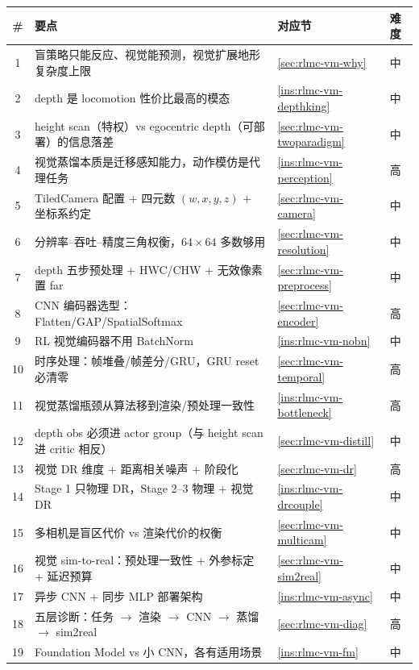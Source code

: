 \begin{center}
\small
\begin{tabular}{@{}clll@{}}
\toprule
\# & 要点 & 对应节 & 难度 \\
\midrule
1 & 盲策略只能反应、视觉能预测，视觉扩展地形复杂度上限 & \cref{sec:rlmc-vm-why} & 中 \\
2 & depth 是 locomotion 性价比最高的模态 & \cref{ins:rlmc-vm-depthking} & 中 \\
3 & height scan（特权）vs egocentric depth（可部署）的信息落差 & \cref{sec:rlmc-vm-twoparadigm} & 中 \\
4 & 视觉蒸馏本质是迁移感知能力，动作模仿是代理任务 & \cref{ins:rlmc-vm-perception} & 高 \\
5 & TiledCamera 配置 + 四元数 $(w,x,y,z)$ + 坐标系约定 & \cref{sec:rlmc-vm-camera} & 中 \\
6 & 分辨率--吞吐--精度三角权衡，$64\times64$ 多数够用 & \cref{sec:rlmc-vm-resolution} & 中 \\
7 & depth 五步预处理 + HWC/CHW + 无效像素置 far & \cref{sec:rlmc-vm-preprocess} & 中 \\
8 & CNN 编码器选型：Flatten/GAP/SpatialSoftmax & \cref{sec:rlmc-vm-encoder} & 高 \\
9 & RL 视觉编码器不用 BatchNorm & \cref{ins:rlmc-vm-nobn} & 中 \\
10 & 时序处理：帧堆叠/帧差分/GRU，GRU reset 必清零 & \cref{sec:rlmc-vm-temporal} & 高 \\
11 & 视觉蒸馏瓶颈从算法移到渲染/预处理一致性 & \cref{ins:rlmc-vm-bottleneck} & 高 \\
12 & depth obs 必须进 actor group（与 height scan 进 critic 相反） & \cref{sec:rlmc-vm-distill} & 中 \\
13 & 视觉 DR 维度 + 距离相关噪声 + 阶段化 & \cref{sec:rlmc-vm-dr} & 高 \\
14 & Stage 1 只物理 DR，Stage 2--3 物理 + 视觉 DR & \cref{ins:rlmc-vm-drcouple} & 中 \\
15 & 多相机是盲区代价 vs 渲染代价的权衡 & \cref{sec:rlmc-vm-multicam} & 中 \\
16 & 视觉 sim-to-real：预处理一致性 + 外参标定 + 延迟预算 & \cref{sec:rlmc-vm-sim2real} & 中 \\
17 & 异步 CNN + 同步 MLP 部署架构 & \cref{ins:rlmc-vm-async} & 中 \\
18 & 五层诊断：任务 $\to$ 渲染 $\to$ CNN $\to$ 蒸馏 $\to$ sim2real & \cref{sec:rlmc-vm-diag} & 高 \\
19 & Foundation Model vs 小 CNN，各有适用场景 & \cref{ins:rlmc-vm-fm} & 中 \\
\bottomrule
\end{tabular}
\end{center}

